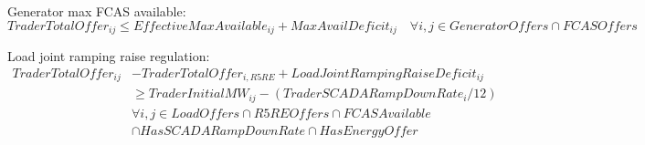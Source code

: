 \documentclass{article}
\begin{document}
%
%
%
%
%

Generator max FCAS available:
\begin{equation}
TraderTotalOffer_{ij} \leq EffectiveMaxAvailable_{ij} + MaxAvailDeficit_{ij} \quad \forall i,j \in GeneratorOffers \cap FCASOffers
\end{equation}

%
%
%
%
%

Load joint ramping raise regulation:
\begin{equation}
\begin{split}
TraderTotalOffer_{ij} & - TraderTotalOffer_{i,R5RE} + LoadJointRampingRaiseDeficit_{ij} \\
& \geq TraderInitialMW_{ij} - (TraderSCADARampDownRate_{i} / 12) \\
& \forall i,j \in LoadOffers \cap R5REOffers \cap FCASAvailable \\
& \cap HasSCADARampDownRate \cap HasEnergyOffer
\end{split}
\end{equation}
\end{document}
